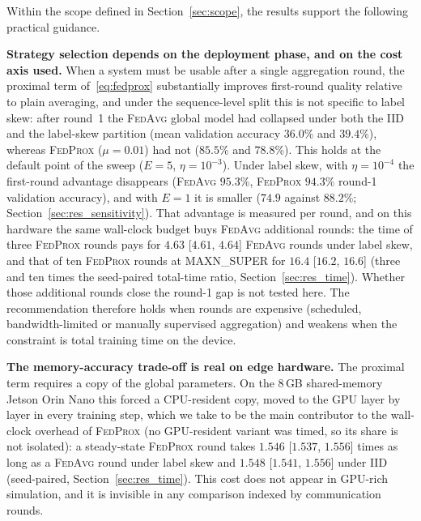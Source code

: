 \documentclass[journal]{IEEEtran}
\newcommand{\fedavg}{\textsc{FedAvg}}
\newcommand{\fedprox}{\textsc{FedProx}}
\begin{document}
Within the scope defined in Section~\ref{sec:scope}, the results support the following practical guidance.

\textbf{Strategy selection depends on the deployment phase, and on the cost axis used.} When a system must be usable after a single aggregation round, the proximal term of~\eqref{eq:fedprox} substantially improves first-round quality relative to plain averaging, and under the sequence-level split this is not specific to label skew: after round~1 the \fedavg{} global model had collapsed under both the IID and the label-skew partition (mean validation accuracy $36.0$\% and $39.4$\%), whereas \fedprox{} ($\mu=0.01$) had not ($85.5$\% and $78.8$\%). This holds at the default point of the sweep ($E=5$, $\eta=10^{-3}$). Under label skew, with $\eta=10^{-4}$ the first-round advantage disappears (\fedavg{} $95.3$\%, \fedprox{} $94.3$\% round-1 validation accuracy), and with $E=1$ it is smaller ($74.9$ against $88.2$\%; Section~\ref{sec:res_sensitivity}). That advantage is measured per round, and on this hardware the same wall-clock budget buys \fedavg{} additional rounds: the time of three \fedprox{} rounds pays for $4.63$ [$4.61$, $4.64$] \fedavg{} rounds under label skew, and that of ten \fedprox{} rounds at MAXN\_SUPER for $16.4$ [$16.2$, $16.6$] (three and ten times the seed-paired total-time ratio, Section~\ref{sec:res_time}). Whether those additional rounds close the round-1 gap is not tested here. The recommendation therefore holds when rounds are expensive (scheduled, bandwidth-limited or manually supervised aggregation) and weakens when the constraint is total training time on the device.

\textbf{The memory-accuracy trade-off is real on edge hardware.} The proximal term requires a copy of the global parameters. On the 8\,GB shared-memory Jetson Orin Nano this forced a CPU-resident copy, moved to the GPU layer by layer in every training step, which we take to be the main contributor to the wall-clock overhead of \fedprox{} (no GPU-resident variant was timed, so its share is not isolated): a steady-state \fedprox{} round takes $1.546$ [$1.537$, $1.556$] times as long as a \fedavg{} round under label skew and $1.548$ [$1.541$, $1.556$] under IID (seed-paired, Section~\ref{sec:res_time}). This cost does not appear in GPU-rich simulation, and it is invisible in any comparison indexed by communication rounds.
\end{document}
